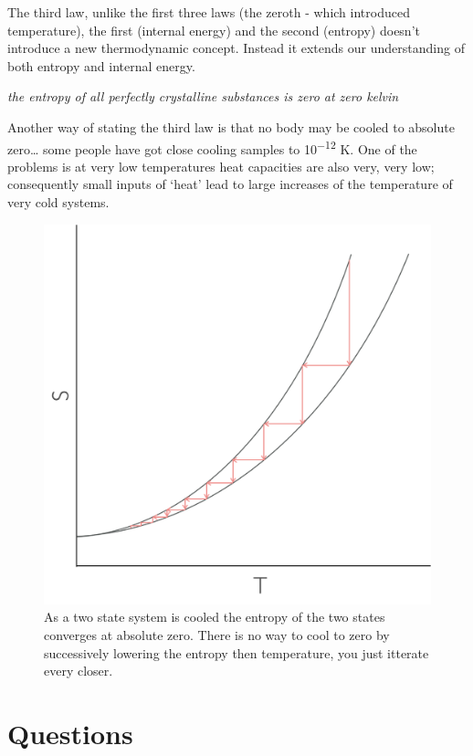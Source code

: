 \documentclass[
]{book}
\begin{document}
The third law, unlike the first three laws (the zeroth - which introduced temperature), the first (internal energy) and the second (entropy) doesn't introduce a new thermodynamic concept. Instead it extends our understanding of both entropy and internal energy.

\emph{the entropy of all perfectly crystalline substances is zero at zero kelvin}

Another way of stating the third law is that no body may be cooled to absolute zero\ldots{} some people have got close cooling samples to 10\textsuperscript{−12} K. One of the problems is at very low temperatures heat capacities are also very, very low; consequently small inputs of `heat' lead to large increases of the temperature of very cold systems.

\begin{figure}

{\centering \includegraphics[width=1\linewidth]{images/cooling} 

}

\caption{As a two state system is cooled the entropy of the two states converges at absolute zero. There is no way to cool to zero by successively lowering the entropy then temperature, you just itterate every closer.}\label{fig:cooling}
\end{figure}

\hypertarget{sec:w4p2question}{%
\section{Questions}\label{sec:w4p2question}}
\end{document}
